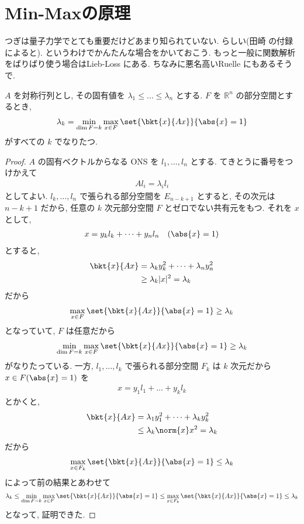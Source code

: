 \documentclass[openany, a4paper, oneside]{jsbook}
\begin{document}
\section{Min-Maxの原理}

つぎは量子力学でとても重要だけどあまり知られていない.
らしい(田崎 \cite{HalTasaki3}の付録によると).
というわけでかんたんな場合をかいておこう.
もっと一般に関数解析をばりばり使う場合はLieb-Loss \cite{LiebLoss1}にある.
ちなみに悪名高いRuelle \cite{DavidRuelle1}にもあるそうで.
\begin{thm}
 $A$ を対称行列とし, その固有値を $\lambda_1 \le \dots \le \lambda_n$
 とする.
 $F$ を $\mathbb{R}^n$ の部分空間とするとき,
 \begin{align}
  \lambda_k
  =
  \min_{\dim F=k} \max_{x \in F} \set{\bkt{x}{Ax}}{\abs{x} = 1}
 \end{align}
 がすべての $k$ でなりたつ.
\end{thm}
\begin{proof}
$A$ の固有ベクトルからなる ONS を $l_1, \dots , l_n$ とする.
てきとうに番号をつけかえて
\begin{align}
 Al_i
 =
 \lambda_i l_i
\end{align}
としてよい.
$l_k, \dots , l_n$ で張られる部分空間を $E_{n-k+1}$ とすると,
その次元は $n-k+1$ だから, 任意の $k$ 次元部分空間 $F$ とゼロでない共有元をもつ.
それを $x$ として,
\begin{align}
 x
 =
 y_k l_k + \dots + y_n l_n \quad (\abs{x} = 1)
\end{align}
とすると,
\begin{align}
 \bkt{x}{Ax}
 &=
 \lambda_k y_k^2 + \dots + \lambda_n y_n^2 \\
 &\ge
 \lambda_k |x|^2
 =
 \lambda_k
\end{align}
だから
\begin{align}
 \max_{x\in F } \set{\bkt{x}{Ax}}{\abs{x} = 1}
 \ge
 \lambda_k
\end{align}
となっていて, $F$ は任意だから
\begin{align}
 \min_{\dim F=k} \max_{x\in F} \set{\bkt{x}{Ax}}{\abs{x} = 1}
 \ge
 \lambda_k
\end{align}
がなりたっている.
一方, $l_1, \dots , l_k$ で張られる部分空間 $F_k$ は $k$ 次元だから $x \in F (\abs{x} = 1)$ を
\begin{align}
 x
 =
 y_1 l_1 + \dots + y_k l_k
\end{align}
とかくと,
\begin{align}
 \bkt{x}{Ax}
 &=
 \lambda_1 y_1^2 + \dots + \lambda_k y_k^2  \\
 &\le
 \lambda_k \norm{x}x^2
 =
 \lambda_k
\end{align}
だから
\begin{align}
 \max_{x \in F_k} \set{\bkt{x}{Ax}}{\abs{x} = 1}
 \le
 \lambda_k
\end{align}
によって前の結果とあわせて
\begin{align}
 \lambda_k
 \le
 \min_{\dim F=k} \max_{x \in F} \set{\bkt{x}{Ax}}{\abs{x} = 1}
 \le
 \max_{x \in F_k } \set{\bkt{x}{Ax}}{\abs{x} = 1}
 \le
 \lambda_k
\end{align}
となって, 証明できた.
\end{proof}
\end{document}
